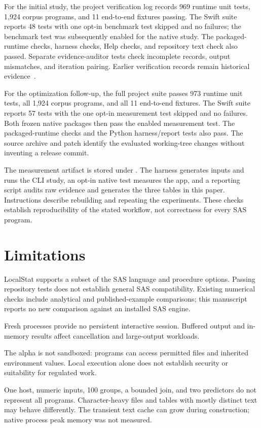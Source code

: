 \documentclass[11pt,a4paper]{article}
\begin{document}
For the initial study, the project verification log records 969 runtime unit
tests, 1,924 corpus programs, and 11 end-to-end fixtures passing.
The Swift suite reports 48 tests with one opt-in benchmark test
skipped and no failures; the benchmark test was subsequently
enabled for the native study. The packaged-runtime checks,
harness checks, Help checks, and repository text check also
passed. Separate evidence-auditor tests check incomplete records,
output mismatches, and iteration pairing. Earlier verification
records remain historical evidence~\cite{verification}.

For the optimization follow-up, the full project suite passes
973 runtime unit tests, all 1,924 corpus programs, and all 11
end-to-end fixtures. The Swift suite reports 57 tests with the
one opt-in measurement test skipped and no failures. Both
frozen native packages then pass the enabled measurement test.
The packaged-runtime checks and the Python harness/report tests
also pass. The source archive and patch identify the evaluated
working-tree changes without inventing a release commit.

The measurement artifact is stored under
. The harness generates inputs
and runs the CLI study, an opt-in native test measures the app,
and a reporting script audits raw evidence and generates the
three tables in this paper. Instructions describe rebuilding and
repeating the experiments. These checks establish reproducibility
of the stated workflow, not correctness for every SAS program.

\clearpage
\section{Limitations}

LocalStat supports a subset of the SAS language and procedure
options. Passing repository tests does not establish general
SAS compatibility. Existing numerical checks include analytical
and published-example comparisons; this manuscript reports no
new comparison against an installed SAS engine.

Fresh processes provide no persistent interactive session.
Buffered output and in-memory results affect cancellation and
large-output workloads.

The alpha is not sandboxed: programs can access permitted files
and inherited environment values. Local execution alone does not
establish security or suitability for regulated work.

One host, numeric inputs, 100 groups, a bounded join, and two
predictors do not represent all programs. Character-heavy files
and tables with mostly distinct text may behave differently.
The transient text cache can grow during construction; native
process peak memory was not measured.
\end{document}
